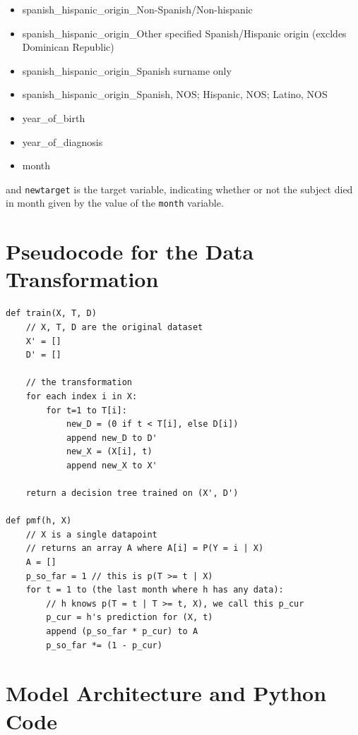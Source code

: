 \documentclass[a4paper,11pt]{article}
\newcommand{\codewhite}[1]{\colorbox{white}{\texttt{#1}}}
\begin{document}
\begin{itemize}[noitemsep]
\item spanish\_hispanic\_origin\_Non-Spanish/Non-hispanic
\item spanish\_hispanic\_origin\_Other specified Spanish/Hispanic origin (excldes Dominican Republic)
\item spanish\_hispanic\_origin\_Spanish surname only
\item spanish\_hispanic\_origin\_Spanish, NOS; Hispanic, NOS; Latino, NOS
\item year\_of\_birth
\item year\_of\_diagnosis
\item month
\end{itemize}

and 
\codewhite{newtarget} is the target variable, indicating whether or not the subject died in month given by the value of the \codewhite{month} variable.


\section{Pseudocode for the Data Transformation}
\label{subsec:pseudocode}

\begin{verbatim}
def train(X, T, D)
    // X, T, D are the original dataset
    X' = []
    D' = []

    // the transformation
    for each index i in X:
        for t=1 to T[i]:
            new_D = (0 if t < T[i], else D[i])
            append new_D to D'
            new_X = (X[i], t)
            append new_X to X'

    return a decision tree trained on (X', D')

def pmf(h, X)
    // X is a single datapoint
    // returns an array A where A[i] = P(Y = i | X)
    A = []
    p_so_far = 1 // this is p(T >= t | X)
    for t = 1 to (the last month where h has any data):
        // h knows p(T = t | T >= t, X), we call this p_cur
        p_cur = h's prediction for (X, t)
        append (p_so_far * p_cur) to A
        p_so_far *= (1 - p_cur)

\end{verbatim}




\section{Model Architecture and Python Code}
\end{document}
